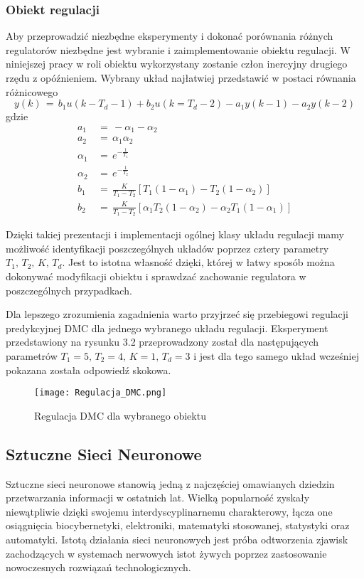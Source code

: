 \subsubsection{Obiekt regulacji}
Aby przeprowadzić niezbędne eksperymenty i dokonać porównania różnych regulatorów niezbędne jest wybranie i zaimplementowanie obiektu regulacji. W niniejszej pracy w roli obiektu wykorzystany zostanie człon inercyjny drugiego rzędu z opóźnieniem. Wybrany układ najłatwiej przedstawić w postaci równania różnicowego 
\begin{equation}
y(k) \, = \, b_1u(k-T_d-1) + b_2u(k=T_d-2)-a_1y(k-1)-a_2y(k-2)
\end{equation}
gdzie 
\begin{align*}
a_1 \, &= \, -\alpha_1 -\alpha_2 \\
a_2 \, &= \, \alpha_1\alpha_2 \\
\alpha_1 \, &= \, e^{-\frac{1}{T_1}} \\
\alpha_2 \, &= \, e^{-\frac{1}{T_2}} \\
b_1 \, &= \, \frac{K}{T_1 - T_2}[T_1(1-\alpha_1)-T_2(1-\alpha_2)] \\
b_2 \, &= \, \frac{K}{T_1 - T_2}[\alpha_1 T_2(1-\alpha_2)-\alpha_2 T_1(1-\alpha_1)]
\end{align*}

\par Dzięki takiej prezentacji i implementacji ogólnej klasy układu regulacji mamy możliwość identyfikacji poszczególnych układów poprzez cztery parametry \( T_1, \, T_2, \, K, \, T_d \). Jest to istotna własność dzięki, której w łatwy sposób można dokonywać modyfikacji obiektu i sprawdzać zachowanie regulatora w poszczególnych przypadkach.

\par Dla lepszego zrozumienia zagadnienia warto przyjrzeć się przebiegowi regulacji predykcyjnej DMC dla jednego wybranego układu regulacji. Eksperyment przedstawiony na rysunku 3.2 przeprowadzony został dla następujących parametrów \( T_1=5, \, T_2=4, \, K=1, \, T_d=3 \) i jest dla tego samego układ wcześniej pokazana została odpowiedź skokowa.  
\begin{figure}[!h]
    \label{fig:Regulacja-DMC}
    \centering \texttt{[image: Regulacja\_DMC.png]}
    \caption{Regulacja DMC dla wybranego obiektu}
\end{figure}
\subsection{Sztuczne Sieci Neuronowe}
Sztuczne sieci neuronowe stanowią jedną z najczęściej omawianych dziedzin przetwarzania informacji w ostatnich lat. Wielką popularność zyskały niewątpliwie dzięki swojemu interdyscyplinarnemu charakterowy, łącza one osiągnięcia biocybernetyki, elektroniki, matematyki stosowanej, statystyki oraz automatyki. Istotą działania sieci neuronowych jest próba odtworzenia zjawisk zachodzących w systemach nerwowych istot żywych poprzez zastosowanie nowoczesnych rozwiązań technologicznych.

